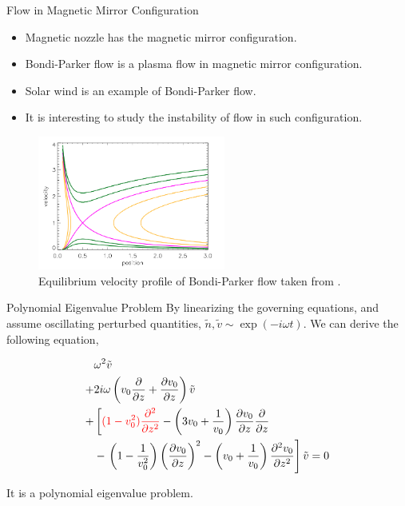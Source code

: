 \begin{frame}{Flow in Magnetic Mirror Configuration}
  \begin{itemize}
    \item Magnetic nozzle has the magnetic mirror configuration.
    \item Bondi-Parker flow is a plasma flow in magnetic mirror configuration.
    \item Solar wind is an example of Bondi-Parker flow.
    \item It is interesting to study the instability of flow in such configuration. 
  \end{itemize} 
  \begin{figure}
    \begin{center}
      \includegraphics[width=0.55\textwidth]{figures/steady-state-BP-flow.png}
    \end{center}
    \caption{Equilibrium velocity profile of Bondi-Parker flow taken from \cite{keto_stability_2020}.}
  \end{figure}
\end{frame}

\begin{frame}{Polynomial Eigenvalue Problem}
  By linearizing the governing equations, and assume oscillating perturbed quantities, $\tilde{n}, \tilde{v} \sim \exp(-i\omega t)$. We can derive the following equation,

  \begin{equation}
    \begin{aligned}
      &\omega^2 \tilde{v} \\ 
      +& 2i\omega\left(v_0\pdv{}{z} + \pdv{v_0}{z}\right) \tilde{v} \\
      +& \left[ \textcolor{red}{(1-v_0^2)\pdv[2]{}{z}} 
        -\left(3v_0 + \frac{1}{v_0}\right)\pdv{v_0}{z}\pdv{}{z} \right. \\
        &- \left. \left(1-\frac{1}{v_0^2}\right)\left(\pdv{v_0}{z}\right)^2 
      - \left(v_0+\frac{1}{v_0}\right)\pdv[2]{v_0}{z} \right]\tilde{v}
      = 0
    \end{aligned}
    \label{eq:polynomial_eigenvalue_problem}
  \end{equation}

  It is a polynomial eigenvalue problem.
\end{frame}
